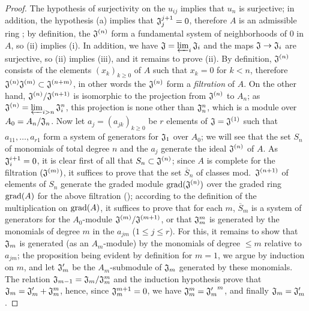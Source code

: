 \begin{proof}
\label{proof-0.7.2.7}
The hypothesis of surjectivity on the $u_{ij}$ implies that $u_n$ is surjective;
in addition, the hypothesis (a) implies that $\mathfrak{J}_j^{j+1}=0$, therefore
$A$ is an admissible ring ; by definition, the
$\mathfrak{J}^{(n)}$ form a fundamental system of neighborhoods of $0$ in $A$,
so (ii) implies (i). In addition, we have
$\mathfrak{J}=\varprojlim_i\mathfrak{J}_i$ and the maps
$\fk{J}\to\fk{J}_i$ are surjective, so (ii) implies (iii), and it
remains to prove (ii). By definition, $\mathfrak{J}^{(n)}$ consists of the
elements $(x_k)_{k\geqslant 0}$ of $A$ such that $x_k=0$ for $k<n$, therefore
$\mathfrak{J}^{(n)}\mathfrak{J}^{(m)}\subset\mathfrak{J}^{(n+m)}$, in other
words the $\mathfrak{J}^{(n)}$ form a \emph{filtration} of $A$. On the other
hand, $\mathfrak{J}^{(n)}/\mathfrak{J}^{(n+1)}$ is isomorphic to the projection
from $\mathfrak{J}^{(n)}$ to $A_n$; as
$\mathfrak{J}^{(n)}=\varprojlim_{i>n}\mathfrak{J}_i^n$, this projection is none
other than $\mathfrak{J}_n^n$, which is a module over $A_0=A_n/\mathfrak{J}_n$.
Now let $a_j=(a_{jk})_{k\geqslant 0}$ be $r$ elements of
$\mathfrak{J}=\mathfrak{J}^{(1)}$ such that $a_{11},\dots,a_{r1}$ form a system
of generators for $\mathfrak{J}_1$ over $A_0$; we will see that the set $S_n$ of
monomials of total degree $n$ and the $a_j$ generate the ideal
$\mathfrak{J}^{(n)}$ of $A$. As $\mathfrak{J}_i^{i+1}=0$, it is clear first of
all that $S_n\subset\mathfrak{J}^{(n)}$; since $A$ is complete for the
filtration $(\mathfrak{J}^{(m)})$, it suffices to prove that the set
$\overline{S}_n$ of classes mod.~$\mathfrak{J}^{(n+1)}$ of elements of $S_n$
generate the graded module ${\mathop{\mathrm{grad}}\nolimits}(\mathfrak{J}^{(n)})$ over the graded ring
${\mathop{\mathrm{grad}}\nolimits}(A)$ for the above filtration (\cite[p.~18--06, lemme]{I-1}); according to
the definition of the multiplication on ${\mathop{\mathrm{grad}}\nolimits}(A)$,
it suffices to prove that for each $m$, $\overline{S}_m$ is a system of
generators for the $A_0$-module $\mathfrak{J}^{(m)}/\mathfrak{J}^{(m+1)}$, or
that $\mathfrak{J}_m^m$ is generated by the monomials of degree $m$ in the
$a_{jm}$ ($1\leqslant j\leqslant r$). For this, it remains to show that
$\mathfrak{J}_m$ is generated (as an $A_m$-module) by the monomials of degree
$\leqslant m$ relative to $a_{jm}$; the proposition being evident by definition
for $m=1$, we argue by induction on $m$, and let $\mathfrak{J}_m'$ be the
$A_m$-submodule of $\mathfrak{J}_m$ generated by these monomials. The relation
$\mathfrak{J}_{m-1}=\mathfrak{J}_m/\mathfrak{J}_m^m$ and the induction
hypothesis prove that $\mathfrak{J}_m=\mathfrak{J}_m'+\mathfrak{J}_m^m$, hence,
since $\mathfrak{J}_m^{m+1}=0$, we have $\mathfrak{J}_m^m={\mathfrak{J}_m'}^m$,
and finally $\mathfrak{J}_m=\mathfrak{J}_m'$.
\end{proof}

